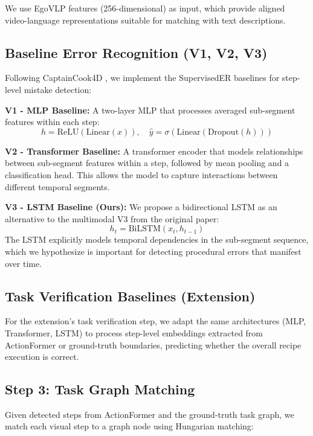 \documentclass[10pt,twocolumn,letterpaper]{article}
\begin{document}
We use EgoVLP features (256-dimensional) as input, which provide aligned video-language representations suitable for matching with text descriptions.

\subsection{Baseline Error Recognition (V1, V2, V3)}

Following CaptainCook4D \cite{peddi2024captaincook4d}, we implement the SupervisedER baselines for step-level mistake detection:

\textbf{V1 - MLP Baseline:} A two-layer MLP that processes averaged sub-segment features within each step:
\begin{equation}
h = \text{ReLU}(\text{Linear}(x)), \quad \hat{y} = \sigma(\text{Linear}(\text{Dropout}(h)))
\end{equation}

\textbf{V2 - Transformer Baseline:} A transformer encoder that models relationships between sub-segment features within a step, followed by mean pooling and a classification head. This allows the model to capture interactions between different temporal segments.

\textbf{V3 - LSTM Baseline (Ours):} We propose a bidirectional LSTM as an alternative to the multimodal V3 from the original paper:
\begin{equation}
h_t = \text{BiLSTM}(x_t, h_{t-1})
\end{equation}
The LSTM explicitly models temporal dependencies in the sub-segment sequence, which we hypothesize is important for detecting procedural errors that manifest over time.

\subsection{Task Verification Baselines (Extension)}

For the extension's task verification step, we adapt the same architectures (MLP, Transformer, LSTM) to process step-level embeddings extracted from ActionFormer or ground-truth boundaries, predicting whether the overall recipe execution is correct.

\subsection{Step 3: Task Graph Matching}

Given detected steps from ActionFormer and the ground-truth task graph, we match each visual step to a graph node using Hungarian matching:
\end{document}
